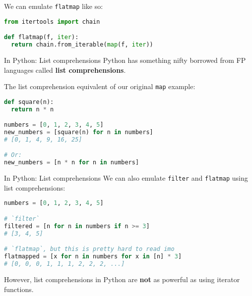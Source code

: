 \documentclass[../index.tex]{subfiles}
\begin{document}
\begin{frame}[fragile]{\currenttitle}
  We can emulate \texttt{flatmap} like so: \\[1em]

  \begin{lstlisting}[language=Python]
from itertools import chain

def flatmap(f, iter):
  return chain.from_iterable(map(f, iter))
  \end{lstlisting}
\end{frame}

\renewcommand{\currenttitle}{In Python: List comprehensions}
\begin{frame}[fragile]{\currenttitle}
  Python has something nifty borrowed from FP languages called \textbf{list
  comprehensions}.

  The list comprehension equivalent of our original \texttt{map} example:

  \begin{lstlisting}[language=Python]
def square(n):
  return n * n

numbers = [0, 1, 2, 3, 4, 5]
new_numbers = [square(n) for n in numbers]
# [0, 1, 4, 9, 16, 25]

# Or:
new_numbers = [n * n for n in numbers]
  \end{lstlisting}
\end{frame}

\begin{frame}[fragile]{\currenttitle}
  We can also emulate \texttt{filter} and \texttt{flatmap} using list
  comprehensions:

  \begin{lstlisting}[language=Python]
numbers = [0, 1, 2, 3, 4, 5]

# `filter`
filtered = [n for n in numbers if n >= 3]
# [3, 4, 5]

# `flatmap`, but this is pretty hard to read imo
flatmapped = [x for n in numbers for x in [n] * 3]
# [0, 0, 0, 1, 1, 1, 2, 2, 2, ...]
  \end{lstlisting}

  However, list comprehensions in Python are \textbf{not} as powerful as using
  iterator functions.
\end{frame}
\end{document}
